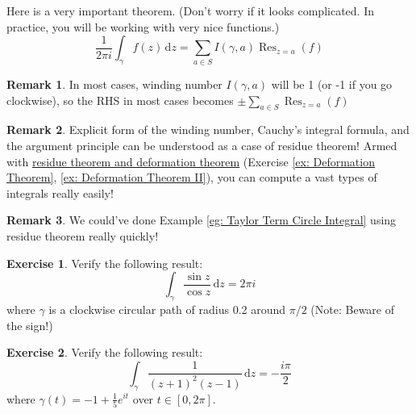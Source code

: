 \documentclass[a4paper, 12pt]{article}
\theoremstyle{definition}
\newtheorem{exercise}{Exercise}
\newtheorem{remark}{Remark}
\numberwithin{theorem}{section}
\numberwithin{definition}{section}
\numberwithin{exercise}{section}
\numberwithin{remark}{section}
\numberwithin{figure}{section}
\numberwithin{example}{section}
\newcommand{\intd}{\,\text{d}}
\DeclareMathOperator{\res}{Res}
\begin{document}
Here is a very important theorem.
(Don't worry if it looks complicated. In practice, you will be working with very nice functions.)
\begin{equation*}
    \frac{1}{2\pi i} \int_{\gamma} f(z) \intd z = \sum_{a \in S} I \left( \gamma, a \right) \res_{z=a} (f)
\end{equation*}
\begin{remark}
    In most cases, winding number $I(\gamma, a)$ will be 1 (or -1 if you go clockwise), so the RHS in most cases becomes $\pm \sum_{a \in S} \res_{z=a} (f)$
\end{remark}
\begin{remark}
    Explicit form of the winding number, Cauchy's integral formula, and the argument principle can be understood as a case of residue theorem!
    Armed with \ul{residue theorem and deformation theorem} (Exercise \ref{ex: Deformation Theorem}, \ref{ex: Deformation Theorem II}),
    you can compute a vast types of integrals really easily!
\end{remark}
\begin{remark}
    We could've done Example \ref{eg: Taylor Term Circle Integral} using residue theorem really quickly!
\end{remark}
\begin{exercise}
    Verify the following result:
    \begin{equation*}
        \int_{\gamma} \frac{\sin{z}}{\cos{z}} \intd z = 2 \pi i
    \end{equation*}
    where $\gamma$ is a clockwise circular path of radius 0.2 around $\pi/2$
    (Note: Beware of the sign!)
\end{exercise}
\begin{exercise}
    Verify the following result:
    \begin{equation*}
        \int_{\gamma} \frac{1}{\left( z+1 \right)^2 \left( z-1 \right)} \intd z = -\frac{i \pi}{2}
    \end{equation*}
    where $\gamma(t) = -1 + \frac{1}{5} e^{it}$ over $t\in\left[ 0,2\pi \right]$.
\end{exercise}
\end{document}
